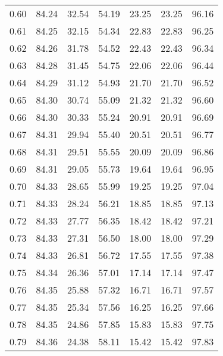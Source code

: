 \begin{tabular}{|c|c|c|c|c|c|c|}
      0.60 &     84.24 &     32.54 &      54.19 &   23.25 &      23.25 &         96.16 \\
      0.61 &     84.25 &     32.15 &      54.34 &   22.83 &      22.83 &         96.25 \\
      0.62 &     84.26 &     31.78 &      54.52 &   22.43 &      22.43 &         96.34 \\
      0.63 &     84.28 &     31.45 &      54.75 &   22.06 &      22.06 &         96.44 \\
      0.64 &     84.29 &     31.12 &      54.93 &   21.70 &      21.70 &         96.52 \\
      0.65 &     84.30 &     30.74 &      55.09 &   21.32 &      21.32 &         96.60 \\
      0.66 &     84.30 &     30.33 &      55.24 &   20.91 &      20.91 &         96.69 \\
      0.67 &     84.31 &     29.94 &      55.40 &   20.51 &      20.51 &         96.77 \\
      0.68 &     84.31 &     29.51 &      55.55 &   20.09 &      20.09 &         96.86 \\
      0.69 &     84.31 &     29.05 &      55.73 &   19.64 &      19.64 &         96.95 \\
      0.70 &     84.33 &     28.65 &      55.99 &   19.25 &      19.25 &         97.04 \\
      0.71 &     84.33 &     28.24 &      56.21 &   18.85 &      18.85 &         97.13 \\
      0.72 &     84.33 &     27.77 &      56.35 &   18.42 &      18.42 &         97.21 \\
      0.73 &     84.33 &     27.31 &      56.50 &   18.00 &      18.00 &         97.29 \\
      0.74 &     84.33 &     26.81 &      56.72 &   17.55 &      17.55 &         97.38 \\
      0.75 &     84.34 &     26.36 &      57.01 &   17.14 &      17.14 &         97.47 \\
      0.76 &     84.35 &     25.88 &      57.32 &   16.71 &      16.71 &         97.57 \\
      0.77 &     84.35 &     25.34 &      57.56 &   16.25 &      16.25 &         97.66 \\
      0.78 &     84.35 &     24.86 &      57.85 &   15.83 &      15.83 &         97.75 \\
      0.79 &     84.36 &     24.38 &      58.11 &   15.42 &      15.42 &         97.83 \\

\end{tabular}
